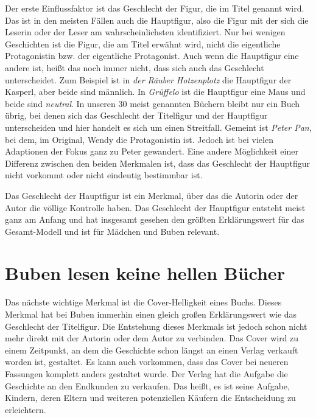Der erste Einflussfaktor ist das Geschlecht der Figur, die im Titel
genannt wird. Das ist in den meisten Fällen auch die Hauptfigur, also
die Figur mit der sich die Leserin oder der Leser am wahrscheinlichsten
identifiziert. Nur bei wenigen Geschichten ist die Figur, die am Titel
erwähnt wird, nicht die eigentliche Protagonistin bzw. der eigentliche
Protagonist. Auch wenn die Hauptfigur eine andere ist, heißt das noch
immer nicht, dass sich auch das Geschlecht unterscheidet. Zum Beispiel
ist in \emph{der Räuber Hotzenplotz} die Hauptfigur der Kasperl, aber
beide sind männlich. In \emph{Grüffelo} ist die Hauptfigur eine Maus und
beide sind \emph{neutral}. In unseren 30 meist genannten Büchern bleibt
nur ein Buch übrig, bei denen sich das Geschlecht der Titelfigur und der
Hauptfigur unterscheiden und hier handelt es sich um einen Streitfall.
Gemeint ist \emph{Peter Pan}, bei dem, im Original, Wendy die
Protagonistin ist. Jedoch ist bei vielen Adaptionen der Fokus ganz zu
Peter gewandert. Eine andere Möglichkeit einer Differenz zwischen den
beiden Merkmalen ist, dass das Geschlecht der Hauptfigur nicht vorkommt
oder nicht eindeutig bestimmbar ist.

Das Geschlecht der Hauptfigur ist ein Merkmal, über das die Autorin oder
der Autor die völlige Kontrolle haben. Das Geschlecht der Hauptfigur
entsteht meist ganz am Anfang und hat insgesamt gesehen den größten
Erklärungswert für das Gesamt-Modell und ist für Mädchen und Buben
relevant.

\section{Buben lesen keine hellen Bücher}

Das nächste wichtige Merkmal ist die Cover-Helligkeit eines Buchs.
Dieses Merkmal hat bei Buben immerhin einen gleich großen Erklärungswert
wie das Geschlecht der Titelfigur. Die Entstehung dieses Merkmals ist
jedoch schon nicht mehr direkt mit der Autorin oder dem Autor zu
verbinden. Das Cover wird zu einem Zeitpunkt, an dem die Geschichte
schon längst an einen Verlag verkauft worden ist, gestaltet. Es kann
auch vorkommen, dass das Cover bei neueren Fassungen komplett anders
gestaltet wurde. Der Verlag hat die Aufgabe die Geschichte an den
Endkunden zu verkaufen. Das heißt, es ist seine Aufgabe, Kindern, deren
Eltern und weiteren potenziellen Käufern die Entscheidung zu
erleichtern.


